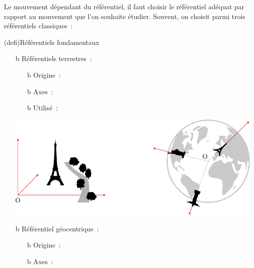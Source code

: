 \documentclass[../../main/main.tex]{subfiles}
\begin{document}
Le mouvement dépendant du référentiel, il faut choisir le référentiel adéquat
par rapport au mouvement que l'on souhaite étudier. Souvent, on choisit parmi
trois référentiels classiques~:
\begin{tcb*}[breakable](defi){Référentiels fondamentaux}
	\begin{itemize}
		\item[b]{Référentiels terrestres}~:
		      \begin{itemize}
			      \item[b]{Origine}~: 
			      \item[b]{Axes}~: 
			      \item[b]{Utilisé}~: 
		      \end{itemize}
		      \begin{center}
		      \end{center}
		      \begin{center}
			      \includegraphics[width=.6\linewidth]{ref_ter}
		      \end{center}
		\item[b]{Référentiel géocentrique}~:
		      \begin{itemize}
			      \item[b]{Origine}~: 
			      \item[b]{Axes}~: 
\end{itemize}
\end{itemize}
\end{tcb*}
\end{document}
